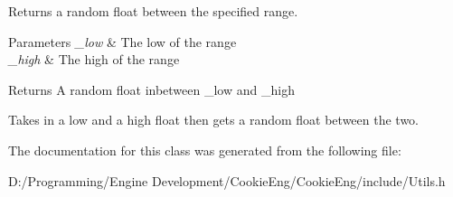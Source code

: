 Returns a random float between the specified range. 


\begin{DoxyParams}{Parameters}
{\em \+\_\+low} & The low of the range \\
\hline
{\em \+\_\+high} & The high of the range \\
\hline
\end{DoxyParams}
\begin{DoxyReturn}{Returns}
A random float inbetween \+\_\+low and \+\_\+high
\end{DoxyReturn}
Takes in a low and a high float then gets a random float between the two. 

The documentation for this class was generated from the following file\+:\begin{DoxyCompactItemize}
\item 
D\+:/\+Programming/\+Engine Development/\+Cookie\+Eng/\+Cookie\+Eng/include/Utils.\+h\end{DoxyCompactItemize}

